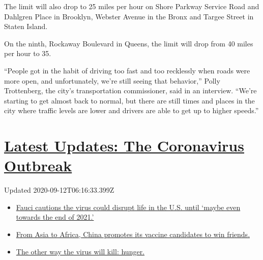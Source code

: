 The limit will also drop to 25 miles per hour on Shore Parkway Service
Road and Dahlgren Place in Brooklyn, Webster Avenue in the Bronx and
Targee Street in Staten Island.

On the ninth, Rockaway Boulevard in Queens, the limit will drop from 40
miles per hour to 35.

``People got in the habit of driving too fast and too recklessly when
roads were more open, and unfortunately, we're still seeing that
behavior,'' Polly Trottenberg, the city's transportation commissioner,
said in an interview. ``We're starting to get almost back to normal, but
there are still times and places in the city where traffic levels are
lower and drivers are able to get up to higher speeds.''

\hypertarget{latest-updates-the-coronavirus-outbreak}{%
\section{\texorpdfstring{\href{https://www.nytimes3xbfgragh.onion/2020/09/11/world/covid-19-coronavirus.html?action=click\&pgtype=Article\&state=default\&region=MAIN_CONTENT_1\&context=storylines_live_updates}{Latest
Updates: The Coronavirus
Outbreak}}{Latest Updates: The Coronavirus Outbreak}}\label{latest-updates-the-coronavirus-outbreak}}

Updated 2020-09-12T06:16:33.399Z

\begin{itemize}
\tightlist
\item
  \href{https://www.nytimes3xbfgragh.onion/2020/09/11/world/covid-19-coronavirus.html?action=click\&pgtype=Article\&state=default\&region=MAIN_CONTENT_1\&context=storylines_live_updates\#link-dfb8a16}{Fauci
  cautions the virus could disrupt life in the U.S. until `maybe even
  towards the end of 2021.'}
\item
  \href{https://www.nytimes3xbfgragh.onion/2020/09/11/world/covid-19-coronavirus.html?action=click\&pgtype=Article\&state=default\&region=MAIN_CONTENT_1\&context=storylines_live_updates\#link-7104d154}{From
  Asia to Africa, China promotes its vaccine candidates to win friends.}
\item
  \href{https://www.nytimes3xbfgragh.onion/2020/09/11/world/covid-19-coronavirus.html?action=click\&pgtype=Article\&state=default\&region=MAIN_CONTENT_1\&context=storylines_live_updates\#link-393ad215}{The
  other way the virus will kill: hunger.}
\end{itemize}

